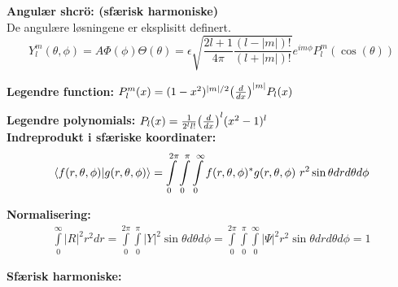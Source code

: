 \documentclass[10p,a4paper]{article}
\begin{document}
\textbf{Angulær shcrö: (sfærisk harmoniske)}\\
De angulære løsningene er eksplisitt definert.
\[ Y_l^m(\theta, \phi) = A\Phi(\phi)\Theta(\theta) = \epsilon\sqrt{\frac{2l+1}{4\pi}\frac{(l-|m|)!}{(l+|m|)!}} e^{im\phi} P_l^m(\cos(\theta)) \]

\textbf{Legendre function:} $P_l^m(x) = (1-x^2)^{|m|/2} \qty(\frac{d}{dx})^{|m|} P_l(x)$

\textbf{Legendre polynomials:} $P_l(x) = \frac{1}{2^ll!}\qty(\frac{d}{dx})^l (x^2-1)^l$
\\

\textbf{Indreprodukt i sfæriske koordinater:}
\[ \bra{f(r,\theta,\phi)}\ket{g(r,\theta,\phi)} = \int\limits_0^{2\pi}\int\limits_0^\pi\int\limits_0^\infty f(r,\theta,\phi)^*g(r,\theta,\phi)\ r^2\sin\theta dr d\theta d\phi \]

\textbf{Normalisering:}
\begin{align*}
\int\limits_0^\infty |R|^2r^2 dr = \int\limits_0^{2\pi}\int\limits_0^\pi |Y|^2\sin\theta d\theta d\phi = 
\int\limits_0^{2\pi}\int\limits_0^\pi\int\limits_0^\infty |\Psi|^2 r^2\sin\theta dr d\theta d\phi = 1
\end{align*}

\textbf{Sfærisk harmoniske:}
\end{document}
